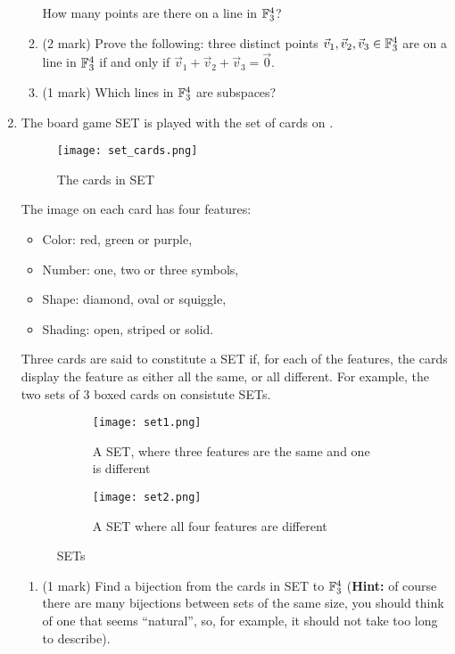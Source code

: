\documentclass[12pt]{article}
\begin{document}
\begin{enumerate}
\begin{enumerate}
    How many points are there on a line in $\mathbb{F}_3^4$?
  \item (2 mark) Prove the following: three distinct points $\vec v_1, \vec v_2,\vec v_3\in \mathbb{F}_3^4$ are on a line in $\mathbb{F}_3^4$ if and only if $\vec v_1 + \vec v_2 + \vec v_3=\vec 0$.
  \item (1 mark) Which lines in $\mathbb{F}_3^4$ are subspaces?
  \end{enumerate}
\item The board game SET is played with the set of cards on .
  \begin{figure}[h]
    \centering
    \texttt{[image: set\_cards.png]}
    \caption{The cards in SET}
    \label{fig:set}
  \end{figure}
  The image on each card has four features:
  \begin{itemize}
  \item Color: red, green or purple,
  \item Number: one, two or three symbols,
  \item Shape: diamond, oval or squiggle,
  \item Shading: open, striped or solid.
  \end{itemize}
  Three cards are said to constitute a SET if, for each of the features, the cards display the feature as either all the same, or all different. For example, the two sets of $3$ boxed cards on  consistute SETs.
  \begin{figure}[h]
    \centering
    \begin{subfigure}[b]{0.35\textwidth}
      \texttt{[image: set1.png]}
      \caption{A SET, where three features are the same and one is different}
      \label{fig:set1}
    \end{subfigure}
    \qquad
    \begin{subfigure}[b]{0.35\textwidth}
      \centering
      \texttt{[image: set2.png]}
      \caption{A SET where all four features are different}
      \label{fig:set2}
    \end{subfigure}
    \caption{SETs}
    \label{fig:sets}
  \end{figure}  
  \begin{enumerate}
  \item (1 mark) Find a bijection from the cards in SET to $\mathbb{F}_3^4$ (\textbf{Hint:} of course there are many bijections between sets of the same size, you should think of one that seems ``natural'', so, for example, it should not take too long to describe). 

\end{enumerate}
\end{enumerate}
\end{document}
